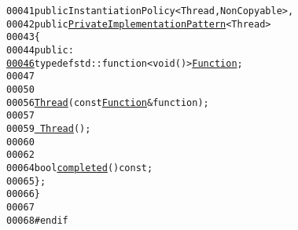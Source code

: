 \begin{footnotesize}
\begin{alltt}
00041         \textcolor{keyword}{public} InstantiationPolicy<Thread, NonCopyable>,
00042         \textcolor{keyword}{public} \hyperlink{classeos_1_1PrivateImplementationPattern}{PrivateImplementationPattern}<Thread>
00043     \{
00044         \textcolor{keyword}{public}:
\hypertarget{thread_8hh_source_l00046}{}\hyperlink{classeos_1_1Thread_a5056834a1e9dce530abf5adb90bb13ba}{00046}             \textcolor{keyword}{typedef} std::function<void ()> \hyperlink{classeos_1_1Thread_a5056834a1e9dce530abf5adb90bb13ba}{Function};
00047 
00050 
00056             \hyperlink{classeos_1_1Thread_ad8d7a9a4d2275f21a42b80fbad67b172}{Thread}(\textcolor{keyword}{const} \hyperlink{classeos_1_1Thread_a5056834a1e9dce530abf5adb90bb13ba}{Function} & function);
00057 
00059             \hyperlink{classeos_1_1Thread_af56391a1c255e3cc9cf754917776af39}{~Thread}();
00060 
00062 
00064             \textcolor{keywordtype}{bool} \hyperlink{classeos_1_1Thread_a4badce4c44db821aaffa5ce06ad1f697}{completed}() \textcolor{keyword}{const};
00065     \};
00066 \}
00067 
00068 \textcolor{preprocessor}{#endif}
\end{alltt}\end{footnotesize}
